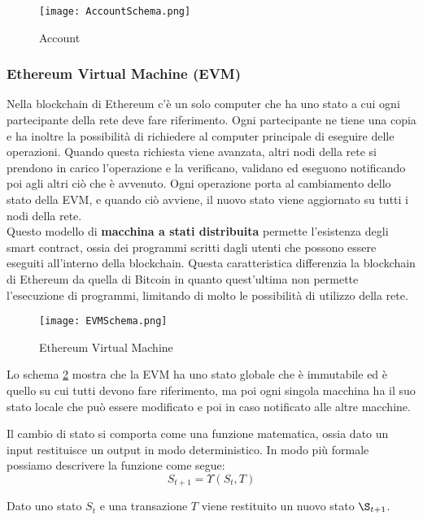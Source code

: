\begin{figure}[H]
    \centering
    \texttt{[image: AccountSchema.png]} 
    \caption{Account}
    \label{fig:Account}
\end{figure}

\subsubsection{Ethereum Virtual Machine (EVM)}
Nella blockchain di Ethereum c'è un solo computer che ha uno stato a cui
ogni partecipante della rete deve fare riferimento. Ogni partecipante ne tiene
una copia e ha inoltre la possibilità di richiedere al computer principale di
eseguire delle operazioni. Quando questa richiesta viene avanzata, altri
nodi della rete si prendono in carico l'operazione e la verificano, validano ed
eseguono notificando poi agli altri ciò che è avvenuto.
Ogni operazione porta al cambiamento dello stato della EVM, e quando ciò
avviene, il nuovo stato viene aggiornato su tutti i nodi della rete. \\
Questo modello di \textbf{macchina a stati distribuita} permette l'esistenza
degli smart contract, ossia dei programmi scritti dagli utenti che possono
essere eseguiti all'interno della blockchain. Questa caratteristica differenzia
la blockchain di Ethereum da quella di Bitcoin in quanto quest'ultima non
permette l'esecuzione di programmi, limitando di molto le possibilità di
utilizzo della rete.

\begin{figure}[H]
    \centering
    \texttt{[image: EVMSchema.png]} 
    \caption{Ethereum Virtual Machine}
    \label{fig:EVM}
\end{figure}

Lo schema \ref{fig:EVM} mostra che la EVM ha uno stato globale che è immutabile
ed è quello su cui tutti devono fare riferimento, ma poi ogni singola macchina
ha il suo stato locale che può essere modificato e poi in caso notificato alle
altre macchine.

Il cambio di stato si comporta come una funzione matematica, ossia dato un
input restituisce un output in modo deterministico. In modo più formale 
possiamo descrivere la funzione come segue:
\begin{equation}
    \label{eq:stateChange}
    S_{t+1} = \Upsilon(S_t, T)
\end{equation}

Dato uno stato $S_t$ e una transazione $T$ viene restituito un nuovo stato
$\S_{t+1}$.


